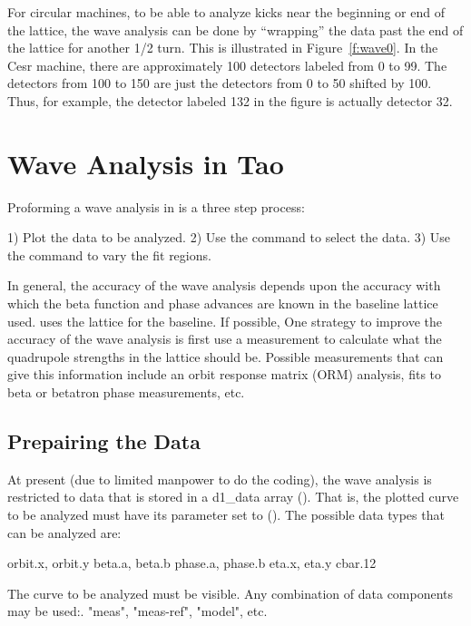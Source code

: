 For circular machines, to be able to analyze kicks near the beginning
or end of the lattice, the wave analysis can be done by ``wrapping''
the data past the end of the lattice for another 1/2 turn. This is
illustrated in Figure~\ref{f:wave0}. In the Cesr machine, there are
approximately 100 detectors labeled from 0 to 99.  The detectors from
100 to 150 are just the detectors from 0 to 50 shifted by 100. Thus,
for example, the detector labeled 132 in the figure is actually
detector 32.

\section{Wave Analysis in Tao}
\label{s:wave.tao}

Proforming a wave analysis in \tao is a three step process:
\begin{example}
  1) Plot the data to be analyzed.
  2) Use the  command to select the data.
  3) Use the  command to vary the fit regions.
\end{example}

In general, the accuracy of the wave analysis depends upon the
accuracy with which the beta function and phase advances are known in
the baseline lattice used. \tao uses the  lattice for the
baseline. If possible, One strategy to improve the accuracy of the
wave analysis is first use a measurement to calculate what the
quadrupole strengths in the  lattice should be. Possible
measurements that can give this information include an orbit response
matrix (ORM) analysis, fits to beta or betatron phase measurements, etc.

\subsection{Prepairing the Data} 
\label{ss:wave.data}

At present (due to limited manpower to do the
coding), the wave analysis is restricted to data that is stored in a
d1_data array (). That is, the plotted curve to be
analyzed must have its  parameter set to
 (). The possible data types that
can be analyzed are:
\begin{example}
  orbit.x, orbit.y
  beta.a,  beta.b
  phase.a, phase.b
  eta.x, eta.y
  cbar.12
\end{example}
The curve to be analyzed must be visible. Any combination of data
components may be used:. "meas", "meas-ref", "model", etc.

